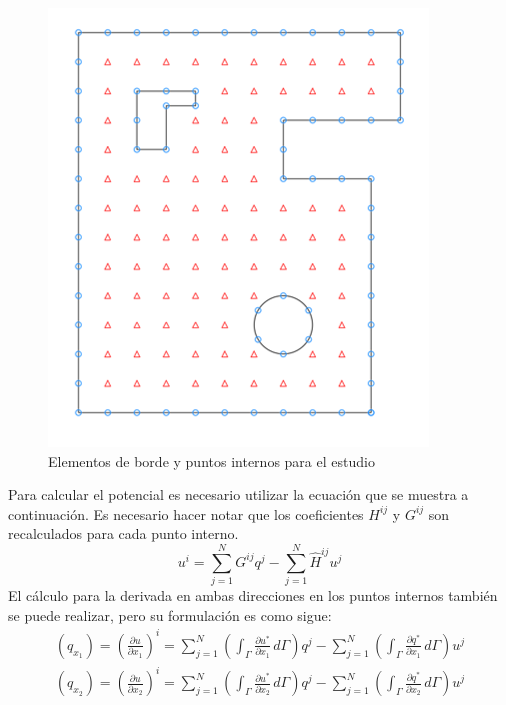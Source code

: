 \begin{figure}[H]
\centering
\includegraphics[scale=1]{Imagenes/bem.png}
\caption{Elementos de borde y puntos internos para el estudio}\label{fig:Puntos internos de BEM}
\end{figure}
Para calcular el potencial es necesario utilizar la ecuación que se muestra a continuación. Es necesario hacer notar que los coeficientes $H^{ij}$ y $G^{ij}$ son recalculados para cada punto interno. 
\begin{equation}
\label{eq:Calculo puntos internos discretizada}
u^i=\sum_{j=1}^NG^{ij}q^j-\sum_{j=1}^N\hat{H}^{ij}u^j
\end{equation}
El cálculo para la derivada en ambas direcciones en los puntos internos también se puede realizar, pero su formulación es como sigue:
\begin{equation}
\label{eq:Calculo derivada en puntos internos}
\begin{split}
\left(q_{x_1}\right)=\left(\frac{\partial u}{\partial x_1}\right)^i=\sum_{j=1}^N\left(\int_\Gamma \frac{\partial u^*}{\partial x_1}\,d\Gamma\right)q^j-\sum_{j=1}^N\left(\int_\Gamma \frac{\partial q^*}{\partial x_1}\,d\Gamma\right)u^j\\
\left(q_{x_2}\right)=\left(\frac{\partial u}{\partial x_2}\right)^i=\sum_{j=1}^N\left(\int_\Gamma \frac{\partial u^*}{\partial x_2}\,d\Gamma\right)q^j-\sum_{j=1}^N\left(\int_\Gamma \frac{\partial q^*}{\partial x_2}\,d\Gamma\right)u^j\\
\end{split}
\end{equation}